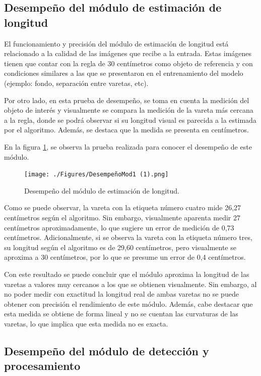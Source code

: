 \subsection{Desempeño del módulo de estimación de longitud}

El funcionamiento y precisión del módulo de estimación de longitud está relacionado a la calidad de las imágenes que recibe a la entrada. Estas imágenes tienen que contar con la regla de 30 centímetros como objeto de referencia y con condiciones similares a las que se presentaron en el entrenamiento del modelo (ejemplo: fondo, separación entre varetas, etc).

Por otro lado, en esta prueba de desempeño, se toma en cuenta la medición del objeto de interés y visualmente se compara la medición de la vareta más cercana a la regla, donde se podrá observar si su longitud visual es parecida a la estimada por el algoritmo. Además, se destaca que la medida se presenta en centímetros.

En la figura \ref{fig:DempeñoEstimacionLongitud}, se observa la prueba realizada para conocer el desempeño de este módulo.

\begin{figure}[ht]
	\centering
	\texttt{[image: ./Figures/DesempeñoMod1 (1).png]}
	\caption{Desempeño del módulo de estimación de longitud.}
	\label{fig:DempeñoEstimacionLongitud}
\end{figure}


Como se puede observar, la vareta con la etiqueta número cuatro mide 26,27 centímetros según el algoritmo. Sin embargo, visualmente aparenta medir 27 centímetros aproximadamente, lo que sugiere un error de medición de 0,73 centímetros. Adicionalmente, si se observa la vareta con la etiqueta número tres, su longitud según el algoritmo es de 29,60 centímetros, pero visualmente se aproxima a 30 centímetros, por lo que se presume un error de 0,4 centímetros. 

Con este resultado se puede concluir que el módulo aproxima la longitud de las varetas a valores muy cercanos a los que se obtienen visualmente. Sin embargo, al no poder medir con exactitud la longitud real de ambas varetas no se puede obtener con precisión el rendimiento de este módulo. Además, cabe destacar que esta medida se obtiene de forma lineal y no se cuentan las curvaturas de las varetas, lo que implica que esta medida no es exacta.

\subsection{Desempeño del módulo de detección y procesamiento}

